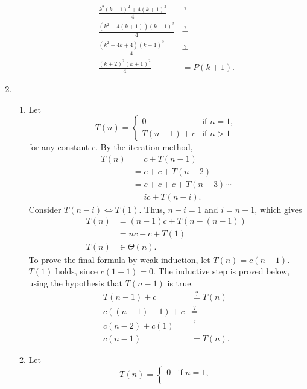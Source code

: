 \documentclass[12pt]{article}
\begin{document}
\begin{enumerate}
\begin{enumerate}
\begin{align*}
            \frac{k^{2} (k + 1)^{2} + 4(k + 1)^{3}}{4} &\stackrel{?}{=} \\
            \frac{(k^{2} + 4(k + 1))(k + 1)^{2}}{4} &\stackrel{?}{=} \\
            \frac{(k^{2} + 4k + 4)(k + 1)^{2}}{4} &\stackrel{?}{=} \\
            \frac{(k + 2)^{2}(k + 1)^{2}}{4} &= P(k + 1).
        \end{align*}
    \end{enumerate}
    \item
    \begin{enumerate}
        \item Let \[
            T(n) = \begin{cases}
                0 &\text{if } n = 1, \\
                T(n - 1) + c &\text{if } n > 1
            \end{cases}
        \] for any constant $c$. By the iteration method,
        \begin{align*}
            T(n) &= c + T(n - 1) \\
            &= c + c + T(n - 2) \\
            &= c + c + c + T(n - 3) \cdots \\
            &= ic + T(n - i).
        \end{align*}
        Consider $T(n - i) \Leftrightarrow T(1)$. Thus, $n - i = 1$ and $i = n - 1$, which gives
        \begin{align*}
            T(n) &= (n - 1)c + T(n - (n - 1)) \\
            &= nc - c + T(1) \\
            T(n) &\in \Theta(n).
        \end{align*}
        To prove the final formula by weak induction, let $T(n) = c(n - 1)$. $T(1)$ holds, since $c(1 - 1) = 0$. The inductive step is proved below, using the hypothesis that $T(n - 1)$ is true.
        \begin{align*}
            T(n - 1) + c &\stackrel{?}{=} T(n) \\
            c((n - 1) - 1) + c &\stackrel{?}{=} \\
            c(n - 2) + c(1) &\stackrel{?}{=} \\
            c(n - 1) &= T(n).
        \end{align*}
        \item Let \[
            T(n) = \begin{cases}
                0 &\text{if } n = 1, \\

\end{cases}\]
\end{enumerate}
\end{enumerate}
\end{document}
